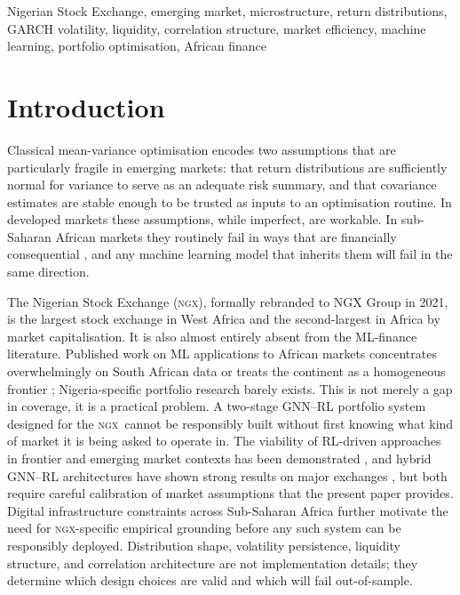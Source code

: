 \documentclass[twoside,11pt]{article}
\newcommand{\ngx}{\textsc{ngx}}
\begin{document}
	\begin{keywords}
		Nigerian Stock Exchange, emerging market, microstructure, return distributions, GARCH volatility, liquidity, correlation structure,
		market efficiency, machine learning, portfolio optimisation, African finance
	\end{keywords}
	
	\section{Introduction}
	\label{sec:intro}
	
	Classical mean-variance optimisation \citep{markowitz1952portfolio} encodes two assumptions that are particularly fragile in emerging markets: that return distributions are sufficiently normal for
	variance to serve as an adequate risk summary, and that covariance estimates are stable enough to be trusted as inputs to an optimisation routine. In developed markets these assumptions, while imperfect, are workable. In sub-Saharan African markets they routinely fail in ways that are financially consequential \citep{bekaert2023globalized}, and any machine learning model that inherits them will fail in the same direction.
	
	The Nigerian Stock Exchange (\ngx), formally rebranded to NGX Group in 2021, is the largest stock exchange in West Africa and the second-largest in Africa by market capitalisation. It is also almost entirely absent from the ML-finance literature. Published work on ML applications to African markets concentrates overwhelmingly on South African data or treats the continent as a homogeneous frontier \citep{adeabah2023african, naeem2024ml}; Nigeria-specific portfolio research barely exists. This is not merely a gap in coverage, it is a practical problem. A two-stage GNN--RL portfolio system \citep{huang2024, wu2021comprehensive, liang2024portfolio, jiang2024drl}
	designed for the \ngx\ cannot be responsibly built without first knowing what kind of market it is being asked to operate in. The viability of RL-driven approaches in frontier and emerging market contexts has been demonstrated \citep{ngo2023frontier}, and hybrid GNN--RL architectures have shown strong results on major
	exchanges \citep{sun2024graphsage}, but both require careful calibration of market assumptions that the
	present paper provides. Digital infrastructure constraints across Sub-Saharan Africa \citep{kouladoum2022digital} further motivate the need for \ngx-specific empirical grounding before any such system can be responsibly deployed. Distribution shape, volatility persistence, liquidity structure, and correlation architecture are
	not implementation details; they determine which design choices are valid and which will fail out-of-sample.
	
\end{document}
